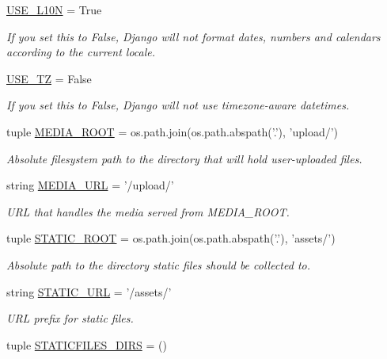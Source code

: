 \begin{DoxyCompactItemize}
\hyperlink{namespacewepo_1_1settings_a397833200b8371e543b3320b2ff94536}{U\-S\-E\-\_\-\-L10\-N} = True
\begin{DoxyCompactList}\small\item\em If you set this to False, Django will not format dates, numbers and calendars according to the current locale. \end{DoxyCompactList}\item 
\hyperlink{namespacewepo_1_1settings_afbf0f0ae28ca43f39ae949a6e1cc61e9}{U\-S\-E\-\_\-\-T\-Z} = False
\begin{DoxyCompactList}\small\item\em If you set this to False, Django will not use timezone-\/aware datetimes. \end{DoxyCompactList}\item 
tuple \hyperlink{namespacewepo_1_1settings_aebf1042bc00e28af6a9d930633df0074}{M\-E\-D\-I\-A\-\_\-\-R\-O\-O\-T} = os.\-path.\-join(os.\-path.\-abspath('.'), 'upload/')
\begin{DoxyCompactList}\small\item\em Absolute filesystem path to the directory that will hold user-\/uploaded files. \end{DoxyCompactList}\item 
string \hyperlink{namespacewepo_1_1settings_a1b1c9434ae3bae0fbf31d4b5da6fed8e}{M\-E\-D\-I\-A\-\_\-\-U\-R\-L} = '/upload/'
\begin{DoxyCompactList}\small\item\em U\-R\-L that handles the media served from M\-E\-D\-I\-A\-\_\-\-R\-O\-O\-T. \end{DoxyCompactList}\item 
tuple \hyperlink{namespacewepo_1_1settings_a0283b3df49c3c6b7121437d5ad176d98}{S\-T\-A\-T\-I\-C\-\_\-\-R\-O\-O\-T} = os.\-path.\-join(os.\-path.\-abspath('.'), 'assets/')
\begin{DoxyCompactList}\small\item\em Absolute path to the directory static files should be collected to. \end{DoxyCompactList}\item 
string \hyperlink{namespacewepo_1_1settings_ad112fb1bf0c5dd90bf992a1b5fef807c}{S\-T\-A\-T\-I\-C\-\_\-\-U\-R\-L} = '/assets/'
\begin{DoxyCompactList}\small\item\em U\-R\-L prefix for static files. \end{DoxyCompactList}\item 
tuple \hyperlink{namespacewepo_1_1settings_a8104d031743dffd8e96120c9a41cbcbd}{S\-T\-A\-T\-I\-C\-F\-I\-L\-E\-S\-\_\-\-D\-I\-R\-S} = ()

\end{DoxyCompactItemize}
